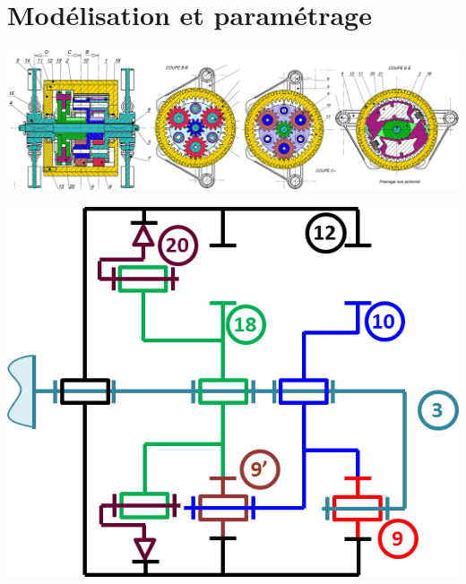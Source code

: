 \documentclass[10pt,fleqn]{article} %
\begin{document}






\section{Modélisation et paramétrage}

\begin{center}
\includegraphics[width=\linewidth]{images/coloriage}
\end{center}


\begin{minipage}[c]{.47\linewidth}
\begin{center}
\includegraphics[width=\linewidth]{images/schema_cinematique}
\end{center}
\end{minipage} \hfill
\begin{minipage}[c]{.47\linewidth}
\begin{center}
\end{center}
\end{minipage}
\end{document}
